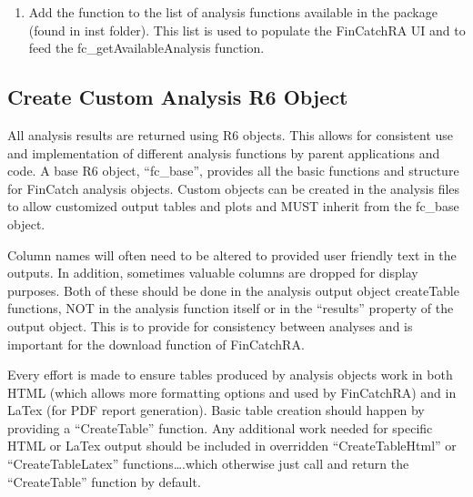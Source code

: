 \documentclass[
  letterpaper,
  DIV=11,
  numbers=noendperiod]{scrreprt}
\providecommand{\tightlist}{%
  \setlength{\itemsep}{0pt}\setlength{\parskip}{0pt}}\usepackage{longtable,booktabs,array}
\begin{document}
\begin{enumerate}
\def\labelenumi{\arabic{enumi}.}
\setcounter{enumi}{11}
\tightlist
\item
  Add the function to the list of analysis functions available in the
  package (found in inst folder). This list is used to populate the
  FinCatchRA UI and to feed the fc\_getAvailableAnalysis function.
\end{enumerate}

\subsection{Create Custom Analysis R6
Object}\label{create-custom-analysis-r6-object}

All analysis results are returned using R6 objects. This allows for
consistent use and implementation of different analysis functions by
parent applications and code. A base R6 object, ``fc\_base'', provides
all the basic functions and structure for FinCatch analysis objects.
Custom objects can be created in the analysis files to allow customized
output tables and plots and MUST inherit from the fc\_base object.

Column names will often need to be altered to provided user friendly
text in the outputs. In addition, sometimes valuable columns are dropped
for display purposes. Both of these should be done in the analysis
output object createTable functions, NOT in the analysis function itself
or in the ``results'' property of the output object. This is to provide
for consistency between analyses and is important for the download
function of FinCatchRA.

Every effort is made to ensure tables produced by analysis objects work
in both HTML (which allows more formatting options and used by
FinCatchRA) and in LaTex (for PDF report generation). Basic table
creation should happen by providing a ``CreateTable'' function. Any
additional work needed for specific HTML or LaTex output should be
included in overridden ``CreateTableHtml'' or ``CreateTableLatex''
functions\ldots.which otherwise just call and return the ``CreateTable''
function by default.
\end{document}
